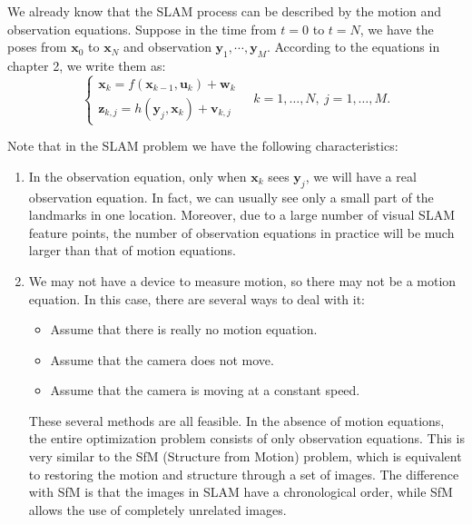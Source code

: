 We already know that the SLAM process can be described by the motion and observation equations. Suppose in the time from $t=0$ to $t=N$, we have the poses from $\bm{x}_0$ to $\bm{x}_N$ and observation $\bm{y}_1, \cdots, \bm{y}_M$. According to the equations in chapter 2, we write them as: 
\begin{equation}
	\left\{ \begin{array}{l}
		{\bm{x}_k} = f\left( {{\bm{x}_{k - 1}},{\bm{u}_k}} \right) + \bm{w}_k \\
		{\bm{z}_{k,j}} = h\left( {{ \bm{y}_j},{ \bm{x}_k}}  \right)+ \bm{v}_{k,j}
	\end{array} \right. \quad k=1, \ldots, N, \  j=1, \ldots, M.
\end{equation}

Note that in the SLAM problem we have the following characteristics:
\begin{enumerate}
	\item In the observation equation, only when $\bm{x}_k$ sees $\bm{y}_j$, we will have a real observation equation. In fact, we can usually see only a small part of the landmarks in one location. Moreover, due to a large number of visual SLAM feature points, the number of observation equations in practice will be much larger than that of motion equations.
	\item We may not have a device to measure motion, so there may not be a motion equation. In this case, there are several ways to deal with it:
	\begin{itemize}
		\item Assume that there is really no motion equation.
		\item Assume that the camera does not move.
		\item Assume that the camera is moving at a constant speed.
	\end{itemize}
	These several methods are all feasible. In the absence of motion equations, the entire optimization problem consists of only observation equations. This is very similar to the SfM (Structure from Motion) problem, which is equivalent to restoring the motion and structure through a set of images. The difference with SfM is that the images in SLAM have a chronological order, while SfM allows the use of completely unrelated images.
\end{enumerate} 

